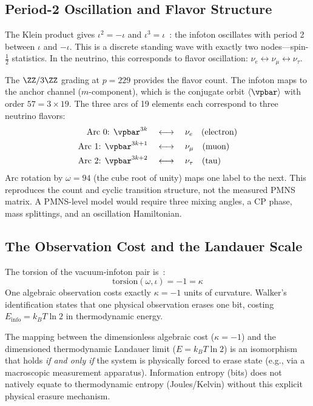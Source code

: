 \subsection{Period-2 Oscillation and Flavor Structure}

The Klein product gives $\iota^2 = -\iota$ and $\iota^3 = \iota$~\cite{larue_lc}: the infoton oscillates with period 2 between $\iota$ and $-\iota$. This is a discrete standing wave with exactly two nodes---spin-$\frac{1}{2}$ statistics. In the neutrino, this corresponds to flavor oscillation: $\nu_e \leftrightarrow \nu_\mu \leftrightarrow \nu_\tau$.

The $\ZZ/3\ZZ$ grading at $p = 229$ provides the flavor count. The infoton maps to the anchor channel ($m$-component), which is the conjugate orbit $\langle \vpbar \rangle$ with order $57 = 3 \times 19$. The three arcs of 19 elements each correspond to three neutrino flavors:
\begin{align}
\text{Arc 0: } \vpbar^{3k} \quad &\longleftrightarrow \quad \nu_e \quad \text{(electron)} \\
\text{Arc 1: } \vpbar^{3k+1} \quad &\longleftrightarrow \quad \nu_\mu \quad \text{(muon)} \\
\text{Arc 2: } \vpbar^{3k+2} \quad &\longleftrightarrow \quad \nu_\tau \quad \text{(tau)}
\end{align}
Arc rotation by $\omega = 94$ (the cube root of unity) maps one label to the next. This reproduces the count and cyclic transition structure, not the measured PMNS matrix. A PMNS-level model would require three mixing angles, a CP phase, mass splittings, and an oscillation Hamiltonian.

\subsection{The Observation Cost and the Landauer Scale}

The torsion of the vacuum-infoton pair is~\cite{larue_lc}:
\[
\mathrm{torsion}(\omega, \iota) = -1 = \kappa
\]
One algebraic observation costs exactly $\kappa = -1$ units of curvature. Walker's identification states that one physical observation erases one bit, costing $E_{\mathrm{info}} = k_B T \ln 2$ in thermodynamic energy. 

\begin{theorem}\label{thm:entropy_iso}
The mapping between the dimensionless algebraic cost ($\kappa = -1$) and the dimensioned thermodynamic Landauer limit ($E = k_B T \ln 2$) is an isomorphism that holds \emph{if and only if} the system is physically forced to erase state (e.g., via a macroscopic measurement apparatus). Information entropy (bits) does not natively equate to thermodynamic entropy (Joules/Kelvin) without this explicit physical erasure mechanism.
\end{theorem}

